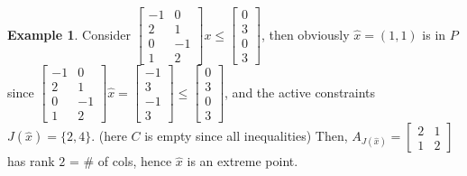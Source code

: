 \documentclass[10pt]{article}
\theoremstyle{definition}
\newtheorem{example}{Example}[section]
\begin{document}
\begin{example}
	Consider $\begin{bmatrix}
			-1 & 0  \\
			2  & 1  \\
			0  & -1 \\
			1  & 2
		\end{bmatrix}x \le \begin{bmatrix}
			0 \\ 3\\ 0\\ 3
		\end{bmatrix}$,
	then obviously $\hat{x} = (1, 1)$ is in $P$ since $\begin{bmatrix}
			-1 & 0  \\
			2  & 1  \\
			0  & -1 \\
			1  & 2
		\end{bmatrix}\hat{x} = \begin{bmatrix}
			-1 \\ 3\\ -1\\ 3
		\end{bmatrix} \le \begin{bmatrix}
			0 \\ 3\\ 0\\ 3
		\end{bmatrix}$, and the active constraints $J(\hat{x}) = \{2, 4\}$.
	(here $C$ is empty since all inequalities)
	Then, $A_{J(\hat{x})} = \begin{bmatrix}
			2 & 1 \\
			1 & 2
		\end{bmatrix}$ has rank $2$ = \# of cols, hence $\hat{x}$ is an extreme point.
\end{example}
\end{document}
